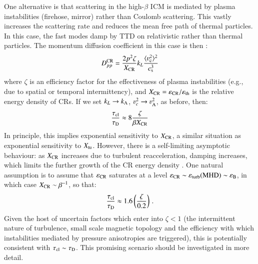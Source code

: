 \documentclass[fleqn,usenatbib,useAMS]{mnras}
\newcommand{\eps}{\varepsilon}
\begin{document}
One alternative is that scattering in the high-$\beta$ ICM is mediated by plasma instabilities (firehose, mirror) rather than Coulomb scattering. This vastly increases the scattering rate and reduces the mean free path of thermal particles. In this case, the fast modes damp by TTD on relativistic rather than thermal particles. The momentum diffusion coefficient in this case is then \citep{brunetti11, miniati15}:
\begin{equation}
D_{pp}^{\rm CR} = \frac{2 p^{2} \zeta}{X_{\rm CR}} k_L \frac{\langle \varv_{\rm c}^{2} \rangle^{2}}{c_{\rm s}^{3}}
\end{equation}
where $\zeta$ is an efficiency factor for the effectiveness of plasma instabilities (e.g., due to spatial or temporal intermittency), and $X_{\rm CR}=\eps_{\rm CR}/\eps_{\rm th}$ is the relative energy density of CRs. If we set $k_L \rightarrow k_{\rm A}$, $\varv_{c}^{2} \rightarrow \varv_{\rm A}^{2}$, as before, then: 
\begin{equation}
\frac{\tau_{\rm cl}}{\tau_{\rm D}} \approx 8 \frac{\zeta}{\beta X_{\rm CR}}
\end{equation}
In principle, this implies exponential sensitivity to $X_{\rm CR}$, a similar situation as exponential sensitivity to $X_{\rm tu}$. However, there is a self-limiting asymptotic behaviour: as $X_{\rm CR}$ increases due to turbulent reacceleration, damping increases, which limits the further growth of the CR energy density \citep{brunetti11}. One natural assumption is to assume that $\eps_{\rm CR}$ saturates at a level $\eps_{\rm CR} \sim \eps_{\rm turb} ({\rm MHD}) \sim \eps_{\rm B}$, in which case $X_{\rm CR} \sim \beta^{-1}$, so that: 
\begin{equation}
\frac{\tau_{\rm cl}}{\tau_{\rm D}} \approx 1.6 \left(\frac{\zeta}{0.2}\right)\,.
\label{eqn:ratios_CR_damp} 
\end{equation}
Given the host of uncertain factors which enter into $\zeta < 1$ (the intermittent nature of turbulence, small scale magnetic topology and the efficiency with which instabilities mediated by pressure anisotropies are triggered), this is potentially consistent with $\tau_{\rm cl} \sim \tau_{\rm D}$. This promising scenario should be investigated in more detail. 
\end{document}

